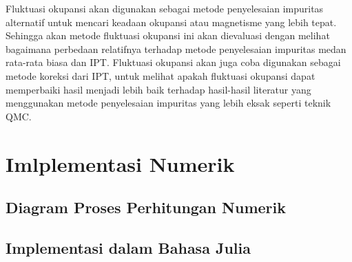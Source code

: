 Fluktuasi okupansi akan digunakan sebagai metode penyelesaian impuritas alternatif untuk mencari keadaan okupansi atau magnetisme yang lebih tepat. Sehingga akan metode fluktuasi okupansi ini akan dievaluasi dengan melihat bagaimana perbedaan relatifnya terhadap metode penyelesaian impuritas medan rata-rata biasa dan IPT. Fluktuasi okupansi akan juga coba digunakan sebagai metode koreksi dari IPT, untuk melihat apakah fluktuasi okupansi dapat memperbaiki hasil menjadi lebih baik terhadap hasil-hasil literatur yang menggunakan metode penyelesaian impuritas yang lebih eksak seperti teknik QMC.

\section{Imlplementasi Numerik}

\subsection{Diagram Proses Perhitungan Numerik}

\subsection{Implementasi dalam Bahasa Julia}


